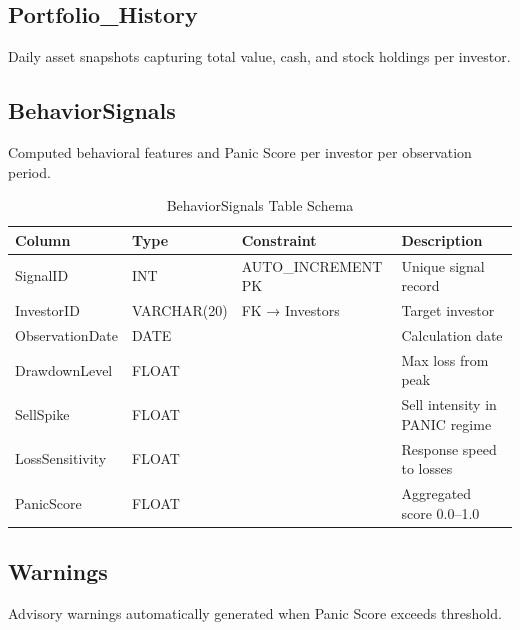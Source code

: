 \subsection{Portfolio\_History}

Daily asset snapshots capturing total value, cash, and stock holdings per investor.

\subsection{BehaviorSignals}

Computed behavioral features and Panic Score per investor per observation period.

\begin{table}[H]
    \centering
    \caption{BehaviorSignals Table Schema}
    \begin{tabular}{llll}
        \toprule
        \textbf{Column} & \textbf{Type} & \textbf{Constraint} & \textbf{Description} \\
        \midrule
        SignalID & INT & AUTO\_INCREMENT PK & Unique signal record \\
        InvestorID & VARCHAR(20) & FK → Investors & Target investor \\
        ObservationDate & DATE & & Calculation date \\
        DrawdownLevel & FLOAT & & Max loss from peak \\
        SellSpike & FLOAT & & Sell intensity in PANIC regime \\
        LossSensitivity & FLOAT & & Response speed to losses \\
        PanicScore & FLOAT & & Aggregated score 0.0–1.0 \\
        \bottomrule
    \end{tabular}
\end{table}

\subsection{Warnings}

Advisory warnings automatically generated when Panic Score exceeds threshold.

